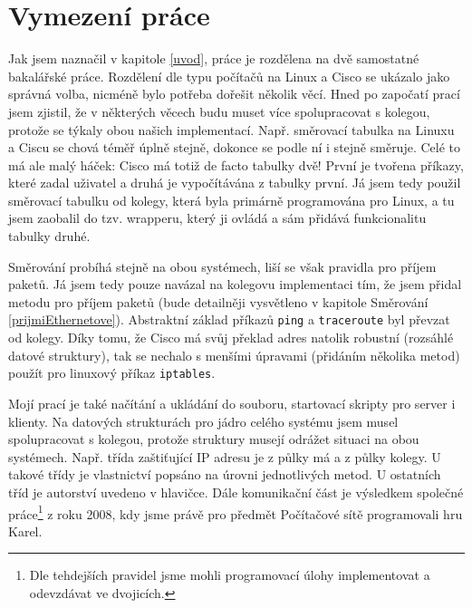 \section{Vymezení práce} \label{vymezeni}
Jak jsem naznačil v kapitole \ref{uvod}, práce je rozdělena na dvě samostatné bakalářské práce. Rozdělení dle typu počítačů na Linux a Cisco se ukázalo jako správná volba, nicméně bylo potřeba dořešit několik věcí. Hned po započatí prací jsem zjistil, že v některých věcech budu muset více spolupracovat s kolegou, protože se týkaly obou našich implementací. Např. směrovací tabulka na Linuxu a Ciscu se chová téměř úplně stejně, dokonce se podle ní i stejně směruje. Celé to má ale malý háček: Cisco má totiž de facto tabulky dvě! První je tvořena příkazy, které zadal uživatel a druhá je vypočítávána z tabulky první. Já jsem tedy použil směrovací tabulku od kolegy, která byla primárně programována pro Linux, a tu jsem zaobalil do tzv. wrapperu, který ji ovládá a sám přidává funkcionalitu tabulky druhé. 

Směrování probíhá stejně na obou systémech, liší se však pravidla pro příjem paketů. Já jsem tedy pouze navázal na kolegovu implementaci tím, že jsem přidal metodu pro příjem paketů (bude detailněji vysvětleno v kapitole Směrování \ref{prijmiEthernetove}). Abstraktní základ příkazů \verb|ping| a \verb|traceroute| byl převzat od kolegy. Díky tomu, že Cisco má svůj překlad adres natolik robustní (rozsáhlé datové struktury), tak se nechalo s menšími úpravami (přidáním několika metod) použít pro linuxový příkaz \verb|iptables|. 

Mojí prací je také načítání a ukládání do souboru, startovací skripty pro server i klienty. Na datových strukturách pro jádro celého systému jsem musel spolupracovat s kolegou, protože struktury musejí odrážet situaci na obou systémech. Např. třída zaštiťující IP adresu je z půlky má a z půlky kolegy. U takové třídy je vlastnictví popsáno na úrovni jednotlivých metod. U ostatních tříd je autorství uvedeno v hlavičce. Dále komunikační část je výsledkem společné práce\footnote{Dle tehdejších pravidel jsme mohli programovací úlohy implementovat a odevzdávat ve dvojicích.} z roku 2008, kdy jsme právě pro předmět Počítačové sítě programovali hru Karel.













